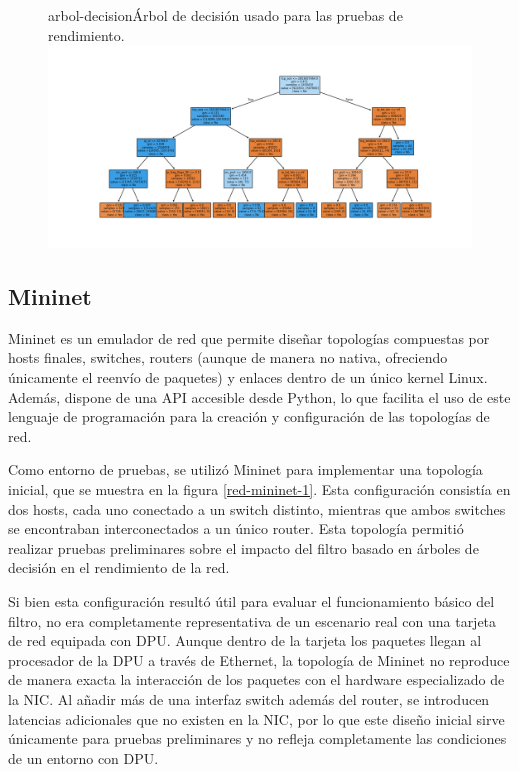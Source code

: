 \begin{figure}[Árbol de Decisión]{arbol-decision}{Árbol de decisión usado para las pruebas de rendimiento.}
	\includegraphics[width=1\textwidth]{capturas/arbolrw2.png}
\end{figure}


\subsection{Mininet}
Mininet es un emulador de red que permite diseñar topologías compuestas por hosts finales, switches, routers (aunque de manera no nativa, ofreciendo únicamente el reenvío de paquetes) y enlaces dentro de un único kernel Linux. Además, dispone de una API accesible desde Python, lo que facilita el uso de este lenguaje de programación para la creación y configuración de las topologías de red\cite{lantz2021mininet}.

Como entorno de pruebas, se utilizó Mininet para implementar una topología inicial, que se muestra en la figura \ref{red-mininet-1}. Esta configuración consistía en dos hosts, cada uno conectado a un switch distinto, mientras que ambos switches se encontraban interconectados a un único router. Esta topología permitió realizar pruebas preliminares sobre el impacto del filtro basado en árboles de decisión en el rendimiento de la red.

Si bien esta configuración resultó útil para evaluar el funcionamiento básico del filtro, no era completamente representativa de un escenario real con una tarjeta de red equipada con DPU. Aunque dentro de la tarjeta los paquetes llegan al procesador de la DPU a través de Ethernet, la topología de Mininet no reproduce de manera exacta la interacción de los paquetes con el hardware especializado de la NIC. Al añadir más de una interfaz switch además del router, se introducen latencias adicionales que no existen en la NIC, por lo que este diseño inicial sirve únicamente para pruebas preliminares y no refleja completamente las condiciones de un entorno con DPU.

